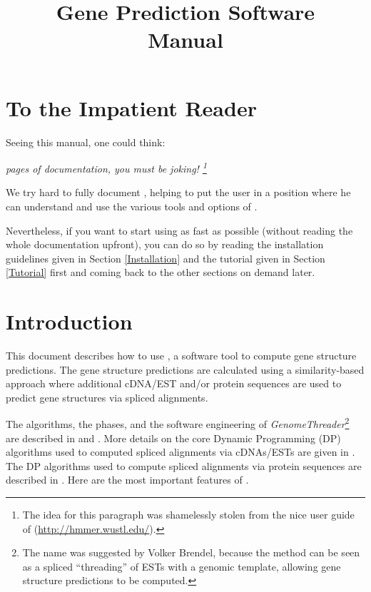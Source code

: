 \documentclass[11pt,a4paper,titlepage]{article}
\title{%
\textbf{\Gth Gene Prediction Software}\\[1cm]
\textbf{Manual}}
\begin{document}
\maketitle

\tableofcontents
\newpage
\listoftables
\newpage

\setlength{\parindent}{0pt}
\setlength{\parskip}{1ex plus 0.5ex minus 0.2ex}

\section*{To the Impatient Reader}
Seeing this manual, one could think:

\emph{\pageref{LastPage} pages of documentation, you must be joking!
\footnote{The idea for this paragraph was shamelessly stolen from the nice user guide of \Hmmer (\url{http://hmmer.wustl.edu/}).}}

We try hard to fully document \Gth, helping to put the user in a position where he can understand and use the various tools and options of \Gth.

Nevertheless, if you want to start using \Gth as fast as possible (without reading the whole documentation upfront), you can do so by reading the installation guidelines given in Section \ref{Installation} and the tutorial given in Section \ref{Tutorial} first and coming back to the other sections on demand later.

\section{Introduction}
This document describes how to use \Gth, a software tool to compute gene structure predictions.
The gene structure predictions are calculated using a similarity-based approach where additional cDNA/EST and/or protein sequences are used to predict gene structures via spliced alignments.

The algorithms, the phases, and the software engineering of
\textit{Genome\-Threader}\footnote{
The name was suggested by Volker Brendel, because the method can be seen
as a spliced ``threading'' of ESTs with a genomic template, allowing
gene structure predictions to be computed.} are described in \cite{GRE:2012} and \cite{GRE:BRE:SPA:KUR:2005}.
More details on the core Dynamic Programming (DP) algorithms used
 to computed spliced alignments via cDNAs/ESTs are given in
\cite{USU:ZHU:BRE:2000}. The DP algorithms used to compute spliced alignments
via protein sequences are described in \cite{USU:BRE:2000}. Here are the most
important features of \Gth.
\end{document}
